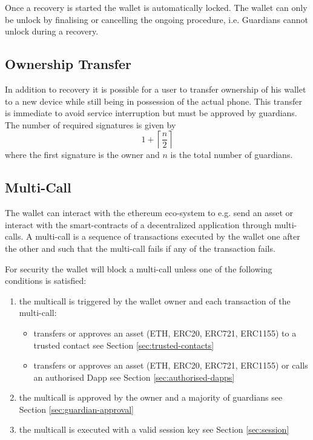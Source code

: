 \documentclass[12pt]{article}
\begin{document}
Once a recovery is started the wallet is automatically locked. The wallet can only be unlock by finalising or cancelling the ongoing procedure, i.e. Guardians cannot unlock during a recovery.

\subsection{Ownership Transfer}

In addition to recovery it is possible for a user to transfer ownership of his wallet to a new device while still being in possession of the actual phone. This transfer is immediate to avoid service interruption but must be approved by guardians. The number of required signatures is given by
\begin{equation*}
    1+\left\lceil {\frac{n}{2}} \right\rceil
\end{equation*}
where the first signature is the owner and $n$ is the total number of guardians.

\subsection{Multi-Call}

The wallet can interact with the ethereum eco-system to e.g. send an asset or interact with the smart-contracts of a decentralized application
through multi-calls. A multi-call is a sequence of transactions executed by the wallet one after the other and such that the multi-call fails if any of the transaction fails.

For security the wallet will block a multi-call unless one of the following conditions is satisfied:
\begin{enumerate}
    \item the multicall is triggered by the wallet owner and each transaction of the multi-call:
    \begin{itemize}
        \item transfers or approves an asset (ETH, ERC20, ERC721, ERC1155) to a trusted contact see Section \ref{sec:trusted-contacts}
        \item transfers or approves an asset (ETH, ERC20, ERC721, ERC1155) or calls an authorised Dapp see Section \ref{sec:authorised-dapps}
    \end{itemize}
    \item the multicall is approved by the owner and a majority of guardians see Section \ref{sec:guardian-approval} 
    \item the multicall is executed with a valid session key see Section \ref{sec:session}
\end{enumerate}
\end{document}
